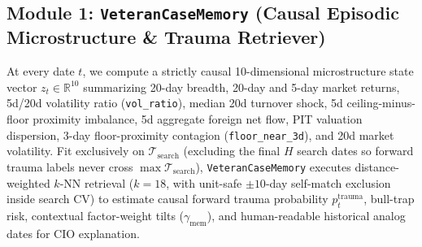\documentclass[11pt]{article}
\begin{document}
\subsection{Module 1: \texttt{VeteranCaseMemory} (Causal Episodic Microstructure \& Trauma Retriever)}
At every date $t$, we compute a strictly causal 10-dimensional microstructure state vector $z_t \in \mathbb{R}^{10}$ summarizing 20-day breadth, 20-day and 5-day market returns, 5d/20d volatility ratio (\texttt{vol\_ratio}), median 20d turnover shock, 5d ceiling-minus-floor proximity imbalance, 5d aggregate foreign net flow, PIT valuation dispersion, 3-day floor-proximity contagion (\texttt{floor\_near\_3d}), and 20d market volatility. Fit exclusively on $\mathcal{T}_{\text{search}}$ (excluding the final $H$ search dates so forward trauma labels never cross $\max \mathcal{T}_{\text{search}}$), \texttt{VeteranCaseMemory} executes distance-weighted $k$-NN retrieval ($k=18$, with unit-safe $\pm 10$-day self-match exclusion inside search CV) to estimate causal forward trauma probability $p^{\text{trauma}}_t$, bull-trap risk, contextual factor-weight tilts ($\gamma_{\text{mem}}$), and human-readable historical analog dates for CIO explanation.
\end{document}
